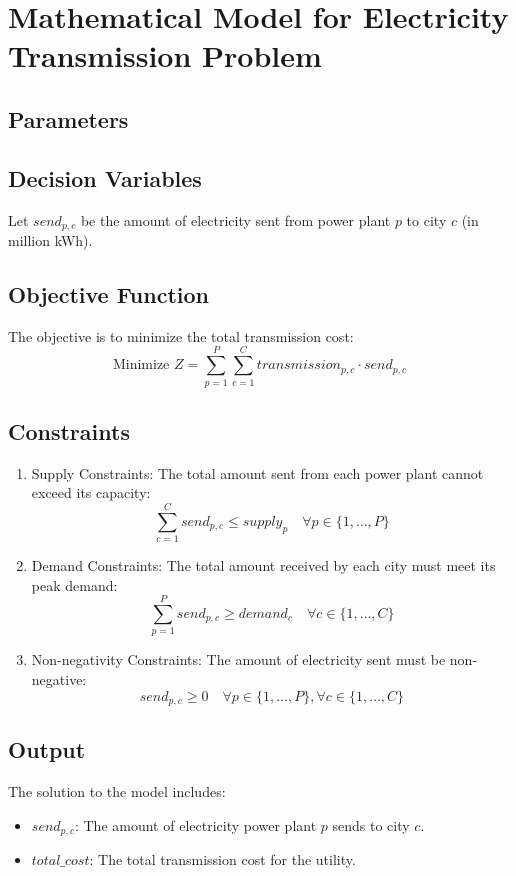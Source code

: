 \documentclass{article}
\begin{document}
\section*{Mathematical Model for Electricity Transmission Problem}

\subsection*{Parameters}

\subsection*{Decision Variables}
Let $send_{p,c}$ be the amount of electricity sent from power plant $p$ to city $c$ (in million kWh).

\subsection*{Objective Function}
The objective is to minimize the total transmission cost:
\[
\text{Minimize } Z = \sum_{p=1}^{P} \sum_{c=1}^{C} transmission_{p,c} \cdot send_{p,c}
\]

\subsection*{Constraints}
\begin{enumerate}
    \item Supply Constraints: The total amount sent from each power plant cannot exceed its capacity:
    \[
    \sum_{c=1}^{C} send_{p,c} \leq supply_{p} \quad \forall p \in \{1, \ldots, P\}
    \]
    
    \item Demand Constraints: The total amount received by each city must meet its peak demand:
    \[
    \sum_{p=1}^{P} send_{p,c} \geq demand_{c} \quad \forall c \in \{1, \ldots, C\}
    \]
    
    \item Non-negativity Constraints: The amount of electricity sent must be non-negative:
    \[
    send_{p,c} \geq 0 \quad \forall p \in \{1, \ldots, P\}, \forall c \in \{1, \ldots, C\}
    \]
\end{enumerate}

\subsection*{Output}
The solution to the model includes:
\begin{itemize}
    \item $send_{p,c}$: The amount of electricity power plant $p$ sends to city $c$.
    \item $total\_cost$: The total transmission cost for the utility.
\end{itemize}
\end{document}
